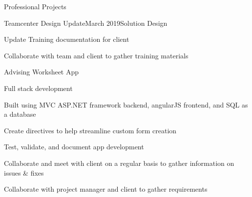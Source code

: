 \documentclass{resume} %
\begin{document}
\begin{rSection}{Professional Projects}
    \begin{rSubsection}{Teamcenter Design Update}{March 2019}{Solution Design}{}
        \item Update Training documentation for client
        \item Collaborate with team and client to gather training materials
    \end{rSubsection}

    \begin{rSubsection}{Advising Worksheet App}{}{}{}
        \item Full stack development 
        \item Built using MVC ASP.NET framework backend, angularJS frontend, and SQL as a database
        \item Create directives to help streamline custom form creation
        \item Test, validate, and document app development
        \item Collaborate and meet with client on a regular basis to gather information on issues \& fixes
        \item Collaborate with project manager and client to gather requirements
    \end{rSubsection}
    
\end{rSection}

    
    
    
\end{document}
